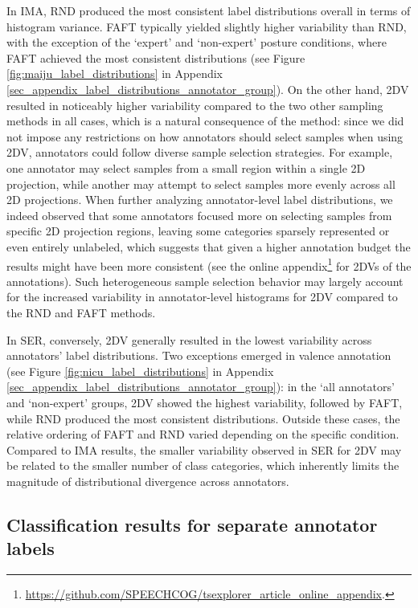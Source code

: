 \documentclass[a4paper,fleqn]{cas-dc}
\begin{document}
In IMA, RND produced the most consistent label distributions overall in terms of histogram variance. FAFT typically yielded slightly higher variability than RND, with the exception of the `expert' and `non-expert' posture conditions, where FAFT achieved the most consistent distributions (see Figure \ref{fig:maiju_label_distributions} in Appendix \ref{sec_appendix_label_distributions_annotator_group}). On the other hand, 2DV resulted in noticeably higher variability compared to the two other sampling methods in all cases, which is a natural consequence of the method: since we did not impose any restrictions on how annotators should select samples when using 2DV, annotators could follow diverse sample selection strategies. For example, one annotator may select samples from a small region within a single 2D projection, while another may attempt to select samples more evenly across all 2D projections. When further analyzing annotator-level label distributions, we indeed observed that some annotators focused more on selecting samples from specific 2D projection regions, leaving some categories sparsely represented or even entirely unlabeled, which suggests that given a higher annotation budget the results might have been more consistent (see the online appendix\footnote{\url{https://github.com/SPEECHCOG/tsexplorer_article_online_appendix}.} for 2DVs of the annotations). Such heterogeneous sample selection behavior may largely account for the increased variability in annotator-level histograms for 2DV compared to the RND and FAFT methods.

In SER, conversely, 2DV generally resulted in the lowest variability across annotators' label distributions. Two exceptions emerged in valence annotation (see Figure \ref{fig:nicu_label_distributions} in Appendix \ref{sec_appendix_label_distributions_annotator_group}): in the `all annotators' and `non-expert' groups, 2DV showed the highest variability, followed by FAFT, while RND produced the most consistent distributions. Outside these cases, the relative ordering of FAFT and RND varied depending on the specific condition. Compared to IMA results, the smaller variability observed in SER for 2DV may be related to the smaller number of class categories, which inherently limits the magnitude of distributional divergence across annotators.


\subsection{Classification results for separate annotator labels} \label{subsec_separate_annotators_results}
\end{document}
